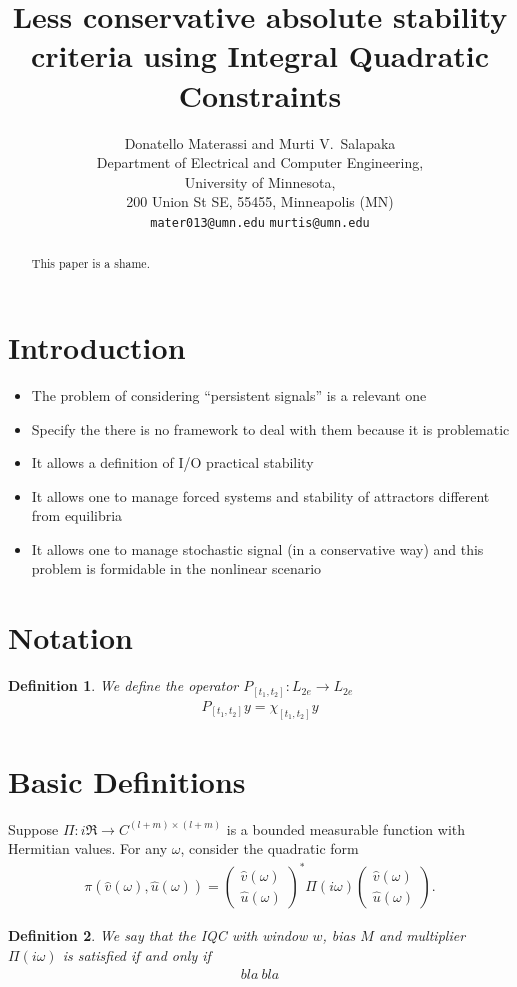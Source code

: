 \documentclass[letterpaper,10pt,conference,twocolumn]{IEEEtran}
\title{Less conservative absolute stability criteria using Integral Quadratic Constraints}
\author{
	Donatello Materassi\IEEEauthorrefmark{1} and
	Murti V.~Salapaka\IEEEauthorrefmark{7} \medskip\\
		Department of Electrical and Computer Engineering,\\
		University of Minnesota,\\
		200 Union St SE, 55455, Minneapolis (MN) \\
	\IEEEauthorrefmark{1}
		{\tt\small mater013@umn.edu} \medskip \qquad
	\IEEEauthorrefmark{7}
		{\tt\small murtis@umn.edu}
}
\newtheorem{dfn}{Definition}
\newcommand{\w}{\omega}
\begin{document}
\maketitle
\thispagestyle{empty}
\pagestyle{empty}

\begin{abstract}
	This paper is a shame.
\end{abstract}

\section{Introduction}
\begin{itemize}
	\item	The problem of considering ``persistent signals'' is a relevant one
	\item	Specify the there is no framework to deal with them because it is problematic
	\item	It allows a definition of I/O practical stability
	\item	It allows one to manage forced systems and stability of attractors different from equilibria
	\item	It allows one to manage stochastic signal (in a conservative way) and this problem is formidable in the nonlinear scenario
\end{itemize}


\section{Notation}\label{sec:notation}
\begin{dfn}
	We define the operator $P_{[t_1, t_2]}:L_{2e}\rightarrow L_{2e}$
	\begin{align}
		P_{[t_1, t_2]}y=\chi_{[t_1,t_2]}y
	\end{align}
\end{dfn}

\section{Basic Definitions}\label{sec:definitions}
Suppose $\Pi: i\Re \rightarrow C^{(l+m)\times (l+m)}$ is a bounded measurable function with Hermitian values. For any $\w$, consider the quadratic form
\begin{align}
	\pi(\hat v(\w), \hat u(\w))=
		\left(\begin{array}{c}
			\hat v(\w)\\
			\hat u(\w)
		\end{array}\right)^*
		\Pi(i\w)
		\left(\begin{array}{c}
			\hat v(\w)\\
			\hat u(\w)
		\end{array}\right).
\end{align}
\begin{dfn}
	We say that the IQC with window $w$, bias $M$ and multiplier $\Pi(i\w)$ is satisfied if and only if
	\begin{align}
		bla~bla
	\end{align}
\end{dfn}
\end{document}

